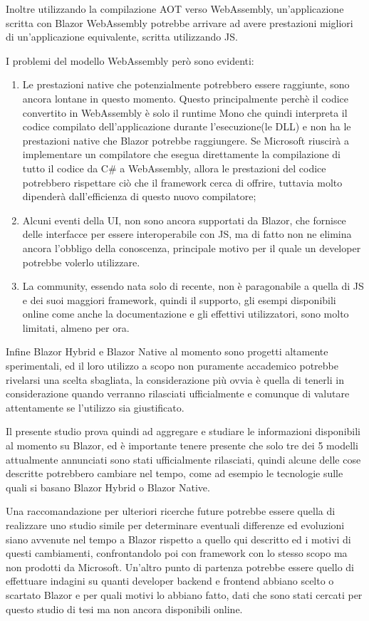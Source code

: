 Inoltre utilizzando la compilazione AOT verso WebAssembly, un'applicazione scritta con Blazor WebAssembly potrebbe arrivare ad avere prestazioni  migliori di un'applicazione equivalente, scritta utilizzando JS.

I problemi del modello WebAssembly per\`o sono evidenti:
\begin{enumerate}
	\item Le prestazioni native che potenzialmente potrebbero essere raggiunte, sono ancora lontane in questo momento.
	Questo principalmente perch\`e il codice convertito in WebAssembly \`e solo il runtime Mono che quindi interpreta il codice compilato dell'applicazione durante l'esecuzione(le DLL) e non ha le prestazioni native che Blazor potrebbe raggiungere.
	Se Microsoft riuscir\`a a implementare un compilatore che esegua direttamente la compilazione di tutto il codice da C\# a WebAssembly, allora le prestazioni del codice potrebbero rispettare ci\`o che il framework cerca di offrire, tuttavia molto dipender\`a dall'efficienza di questo nuovo compilatore;
	\item Alcuni eventi della UI, non sono ancora supportati da Blazor, che fornisce delle interfacce per essere interoperabile con JS, ma di fatto non ne elimina ancora l'obbligo della conoscenza, principale motivo per il quale un developer potrebbe volerlo utilizzare.
	\item La community, essendo nata solo di recente, non \`e paragonabile a quella di JS e dei suoi maggiori framework, quindi il supporto, gli esempi disponibili online come anche la documentazione e gli effettivi utilizzatori, sono molto limitati, almeno per ora.
\end{enumerate}

Infine Blazor Hybrid e Blazor Native al momento sono progetti altamente sperimentali, ed il loro utilizzo a scopo non puramente accademico potrebbe rivelarsi una scelta sbagliata, la considerazione pi\`u ovvia \`e quella di tenerli in considerazione quando verranno rilasciati ufficialmente e comunque di valutare attentamente se l'utilizzo sia giustificato.

Il presente studio prova quindi ad aggregare e studiare le informazioni disponibili al momento su Blazor, ed \`e importante tenere presente che solo tre dei 5 modelli attualmente annunciati sono stati ufficialmente rilasciati, quindi alcune delle cose descritte potrebbero cambiare nel tempo, come ad esempio le tecnologie sulle quali si basano Blazor Hybrid o Blazor Native.

Una raccomandazione per ulteriori ricerche future potrebbe essere quella di realizzare uno studio simile per determinare eventuali differenze ed evoluzioni siano avvenute nel tempo a Blazor rispetto a quello qui descritto ed i motivi di questi cambiamenti, confrontandolo poi con framework con lo stesso scopo ma non prodotti da Microsoft.
Un'altro punto di partenza potrebbe essere quello di effettuare indagini su quanti developer backend e frontend abbiano scelto o scartato Blazor e per quali motivi lo abbiano fatto, dati che sono stati cercati per questo studio di tesi ma non ancora disponibili online.